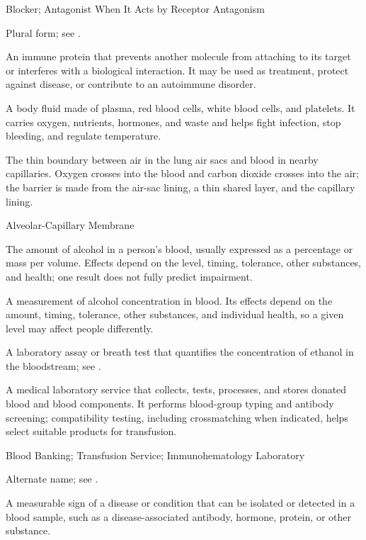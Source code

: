 \synonyms
Blocker; Antagonist When It Acts by Receptor Antagonism

 Plural form; see .

 An immune protein that prevents another molecule from attaching to its target or interferes with a biological interaction. It may be used as treatment, protect against disease, or contribute to an autoimmune disorder.

 A body fluid made of plasma, red blood cells, white blood cells, and platelets. It carries oxygen, nutrients, hormones, and waste and helps fight infection, stop bleeding, and regulate temperature.

 The thin boundary between air in the lung air sacs and blood in nearby capillaries. Oxygen crosses into the blood and carbon dioxide crosses into the air; the barrier is made from the air-sac lining, a thin shared layer, and the capillary lining.

\synonyms
Alveolar-Capillary Membrane

 The amount of alcohol in a person's blood, usually expressed as a percentage or mass per volume. Effects depend on the level, timing, tolerance, other substances, and health; one result does not fully predict impairment.

 A measurement of alcohol concentration in blood. Its effects depend on the amount, timing, tolerance, other substances, and individual health, so a given level may affect people differently.

 A laboratory assay or breath test that quantifies the concentration of ethanol in the bloodstream; see .

 A medical laboratory service that collects, tests, processes, and stores donated blood and blood components. It performs blood-group typing and antibody screening; compatibility testing, including crossmatching when indicated, helps select suitable products for transfusion.

\synonyms
Blood Banking; Transfusion Service; Immunohematology Laboratory

 Alternate name; see .

 A measurable sign of a disease or condition that can be isolated or detected in a blood sample, such as a disease-associated antibody, hormone, protein, or other substance.

